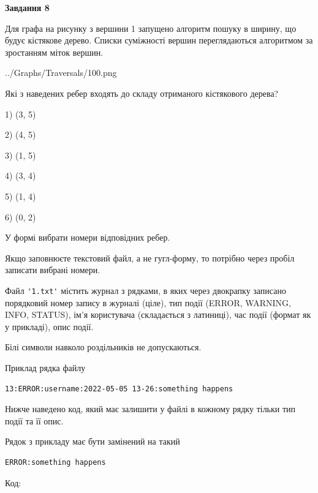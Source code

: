 \documentclass[12pt, ukrainian]{article}
\def\code#1{\Verb!#1!}
\begin{document}
{\begin {large}
{\begin {center}\textbf{Завдання 8}\end {center}}\par
Для графа на рисунку з вершини 1 запущено алгоритм пошуку в ширину, що будує кістякове дерево. Списки суміжності вершин переглядаються алгоритмом за зростанням міток вершин.\par
\begin{center}
	{../Graphs/Traversals/100.png}
\end{center}
\par Які з наведених ребер входять до складу отриманого кістякового дерева?\par
1) (3, 5)\par
2) (4, 5)\par
3) (1, 5)\par
4) (3, 4)\par
5) (1, 4)\par
6) (0, 2)\par
{\vskip 15pt} У формі вибрати номери відповідних ребер.


Якщо заповнюєте текстовий файл, а не гугл-форму, то потрібно через пробіл записа\-ти вибрані номери.\par
\newpage


Файл \code{'1.txt'} містить журнал з рядками, в яких через двокрапку записано поряд\-ко\-вий номер запису в журналі (ціле), тип події (ERROR, WARNING, INFO, STATUS), ім'я користувача (складається з латиниці), час події (фор\-мат як у прикладі), опис події.

Білі символи навколо роздільників не допускаються.

Приклад рядка файлу



\begin{verbatim}
13:ERROR:username:2022-05-05 13-26:something happens
\end{verbatim}


Нижче наведено код, який має залишити у файлі в кожному рядку тільки тип події та її опис.

Рядок з прикладу має бути замінений на такий



\begin{verbatim}
ERROR:something happens
\end{verbatim}




Код:




\end{large}}
\end{document}
